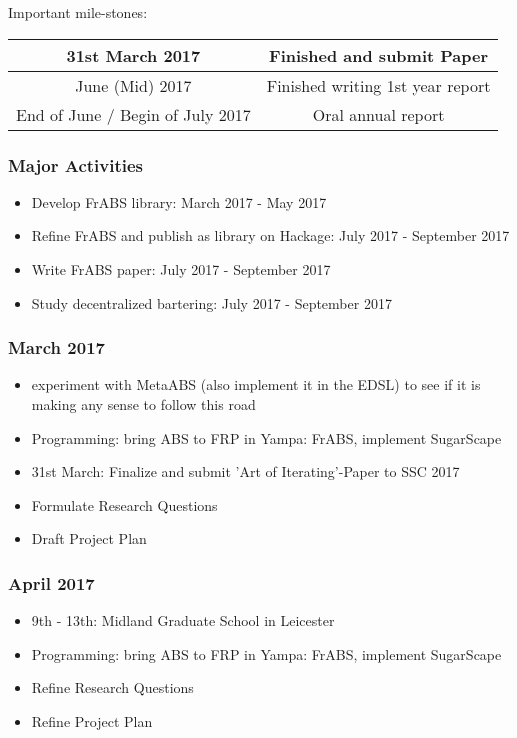 Important mile-stones:

\begin{center}
\begin{tabular}{ c|c } 
	31st March 2017 & Finished and submit Paper \\ 
	\hline
	June (Mid) 2017 & Finished writing 1st year report  \\ 
	\hline
	End of June / Begin of July 2017 & Oral annual report \\
\end{tabular}
\end{center}

\subsubsection{Major Activities}
\begin{itemize}
	\item Develop FrABS library: March 2017 - May 2017
	\item Refine FrABS and publish as library on Hackage: July 2017 - September 2017
	\item Write FrABS paper: July 2017 - September 2017
	\item Study decentralized bartering: July 2017 - September 2017
\end{itemize}


\subsubsection{March 2017}
\begin{itemize}
	\item experiment with MetaABS (also implement it in the EDSL) to see if it is making any sense to follow this road
	\item Programming: bring ABS to FRP in Yampa: FrABS, implement SugarScape
	\item 31st March: Finalize and submit 'Art of Iterating'-Paper to SSC 2017 
	\item Formulate Research Questions
	\item Draft Project Plan
\end{itemize}

\subsubsection{April 2017}
\begin{itemize}
	\item 9th - 13th: Midland Graduate School in Leicester
	\item Programming: bring ABS to FRP in Yampa: FrABS, implement SugarScape
	\item Refine Research Questions
	\item Refine Project Plan
\end{itemize}

